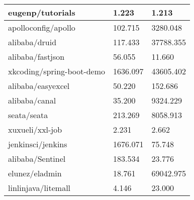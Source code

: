 \begin{table}
\begin{tabular}{|l|ll|}
													     eugenp/tutorials                                                                             & \multicolumn{1}{l|}{1.223}        & 1.213     \\ \hline
													     apolloconfig/apollo                                                                          & \multicolumn{1}{l|}{102.715}      & 3280.048  \\ \hline
													     alibaba/druid                                                                                & \multicolumn{1}{l|}{117.433}      & 37788.355 \\ \hline
													     alibaba/fastjson                                                                             & \multicolumn{1}{l|}{56.055}       & 11.660    \\ \hline
													     xkcoding/spring-boot-demo                                                                    & \multicolumn{1}{l|}{1636.097}     & 43605.402 \\ \hline
													     alibaba/easyexcel                                                                            & \multicolumn{1}{l|}{50.220}       & 152.686   \\ \hline
													     alibaba/canal                                                                                & \multicolumn{1}{l|}{35.200}       & 9324.229  \\ \hline
													     seata/seata                                                                                  & \multicolumn{1}{l|}{213.269}      & 8058.913  \\ \hline
													     xuxueli/xxl-job                                                                              & \multicolumn{1}{l|}{2.231}        & 2.662     \\ \hline
													     jenkinsci/jenkins                                                                            & \multicolumn{1}{l|}{1676.071}     & 75.748    \\ \hline
													     alibaba/Sentinel                                                                             & \multicolumn{1}{l|}{183.534}      & 23.776    \\ \hline
													     elunez/eladmin                                                                               & \multicolumn{1}{l|}{18.761}       & 69042.975 \\ \hline
													     linlinjava/litemall                                                                          & \multicolumn{1}{l|}{4.146}        & 23.000    \\ \hline

\end{tabular}
\end{table}
